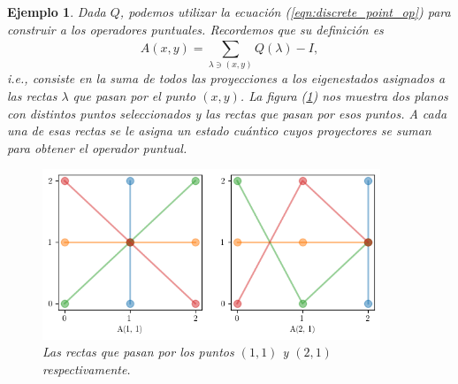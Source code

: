 \documentclass[a4paper]{report}
\newtheorem{example}{Ejemplo}
\begin{document}
\begin{example}
    Dada $Q$, podemos utilizar la ecuación
    (\ref{eqn:discrete_point_op}) para construir a los
    operadores puntuales. Recordemos que su definición es
    \[
      A(x,y) = \sum_{\lambda \ni (x,y)}^{} Q(\lambda) - I,
    \] 
    i.e., consiste en la suma de todos las proyecciones a
    los eigenestados asignados a las rectas $\lambda$ que
    pasan por el punto $(x,y)$. La figura
    (\ref{fig:point-lines-3-1}) nos muestra dos planos con
    distintos puntos seleccionados y las rectas que pasan
    por esos puntos. A cada una de esas rectas se le asigna
    un estado cuántico cuyos proyectores se suman para
    obtener el operador puntual. 
    \begin{figure}[ht]
      \centering
      \includegraphics[width=0.9\textwidth]{imgs/As-3-1.png}
      \caption{Las rectas que pasan por los puntos $(1,1)$ y
      $(2,1)$ respectivamente.}
      \label{fig:point-lines-3-1}
    \end{figure}


\end{example}
\end{document}
